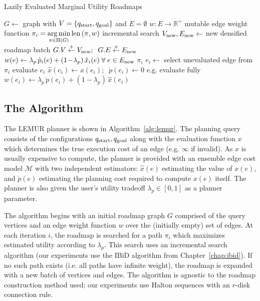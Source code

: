 \begin{algorithm}[t]
\caption{Lazily Evaluated Marginal Utility Roadmaps}
\label{alg:lemur}
\begin{algorithmic}[1]
\State $G \leftarrow$ graph with
   $V = \{ q_{\mbox{\scriptsize start}}, q_{\mbox{\scriptsize goal}} \}$
   and $E = \emptyset$
\State $w : E \rightarrow \mathbb{R}^{+}$
   \Comment mutable edge weight function
   \State $\pi_i = \displaystyle\operatorname*{arg\,min}_{\pi \in \Pi(G)} 
      \mbox{len}\left(\pi, w\right)$
      \Comment incremental search
      \State $V_{\mbox{\scriptsize new}}, E_{\mbox{\scriptsize new}} \leftarrow$ new densified roadmap batch
      \State $G.V \stackrel{\tiny +}\leftarrow V_{\mbox{\scriptsize new}};
         \;\; G.E \stackrel{\tiny +}\leftarrow E_{\mbox{\scriptsize new}}$
      \State $w(e) \leftarrow \lambda_p \, \grave{p}_i(e) + (1\!-\!\lambda_p) \, \hat{x}_i(e)
         \; \forall \; e \in E_{\mbox{\scriptsize new}}$
   \EndIf
      \State \Return $\pi_i$
   \EndIf
   \State $e_i \leftarrow$ select unevaluated edge from $\pi_i$
   \State evaluate $e_i$
   \State $\hat{x}(e_i) \leftarrow x(e_i); \;\; \grave{p}(e_i) \leftarrow 0$
      \Comment e.g. evaluate fully
   \State $w(e_i) \leftarrow
      \lambda_p \, \grave{p}(e_i) + (1\!-\!\lambda_p) \, \hat{x}(e_i)$
\EndFor
\EndProcedure
\end{algorithmic}
\end{algorithm}

\subsection{The Algorithm}

The LEMUR planner is shown in Algorithm~\ref{alg:lemur}.
The planning query consists of the configurations
$q_{\mbox{\scriptsize start}}, q_{\mbox{\scriptsize goal}}$
along with the evaluation function $x$ which determines the true
execution cost of an edge (e.g. $\infty$ if invalid).
As $x$ is usually expensive to compute,
the planner is provided with an ensemble edge cost model $\mathcal{M}$
with two independent estimators:
$\hat{x}(e)$ estimating the value of $x(e)$,
and $\grave{p}(e)$ estimating the planning cost required to
compute $x(e)$ itself.
The planner is also given the user's utility tradeoff
$\lambda_p \in [0,1]$ as a planner parameter.

The algorithm begins with an initial roadmap graph $G$
comprised of the query vertices
and an edge weight function $w$ over the (initially empty) set
of edges.
At each iteration $i$,
the roadmap is searched for a path $\pi_i$
which maximizes estimated utility according to $\lambda_p$.
This search uses an incremental search algorithm
(our experiments use the IBiD algorithm from Chapter~\ref{chap:ibid}).
If no such path exists
(i.e. all paths have infinite weight),
the roadmap is expanded with a new batch of vertices and edges.
The algorithm is agnostic to the roadmap construction method used;
our experiments use Halton sequences with an $r$-disk connection rule.

